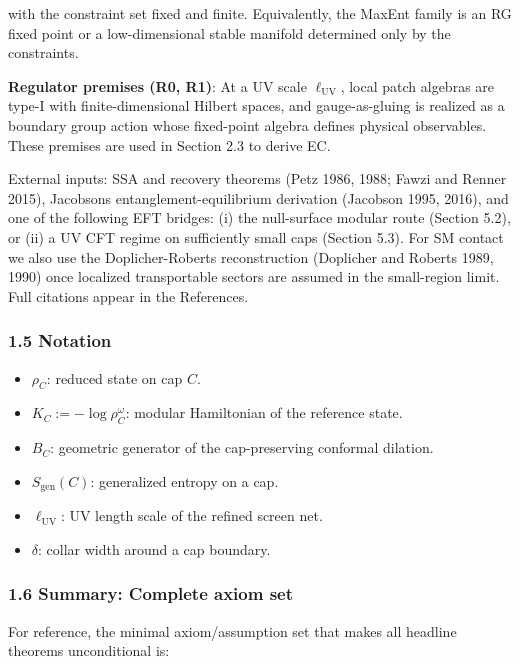 with the constraint set fixed and finite. Equivalently, the MaxEnt family is an RG fixed point or a low-dimensional stable manifold determined only by the constraints.

\textbf{Regulator premises (R0, R1)}: At a UV scale \(\ell_{\mathrm{UV}}\), local patch algebras are type-I with finite-dimensional Hilbert spaces, and gauge-as-gluing is realized as a boundary group action whose fixed-point algebra defines physical observables. These premises are used in Section 2.3 to derive EC.

External inputs: SSA and recovery theorems (Petz 1986, 1988; Fawzi and Renner 2015), Jacobson\textquotesingle s entanglement-equilibrium derivation (Jacobson 1995, 2016), and one of the following EFT bridges: (i) the null-surface modular route (Section 5.2), or (ii) a UV CFT regime on sufficiently small caps (Section 5.3). For SM contact we also use the Doplicher-Roberts reconstruction (Doplicher and Roberts 1989, 1990) once localized transportable sectors are assumed in the small-region limit. Full citations appear in the References.

\subsubsection{1.5 Notation}\label{15-notation}

\begin{itemize}
\tightlist
\item
  \(\rho_C\): reduced state on cap \(C\).
\item
  \(K_C := -\log \rho_C^{\omega}\): modular Hamiltonian of the reference state.
\item
  \(B_C\): geometric generator of the cap-preserving conformal dilation.
\item
  \(S_{\mathrm{gen}}(C)\): generalized entropy on a cap.
\item
  \(\ell_{\mathrm{UV}}\): UV length scale of the refined screen net.
\item
  \(\delta\): collar width around a cap boundary.
\end{itemize}

\subsubsection{1.6 Summary: Complete axiom set}\label{16-summary-complete-axiom-set}

For reference, the minimal axiom/assumption set that makes all headline theorems unconditional is:

